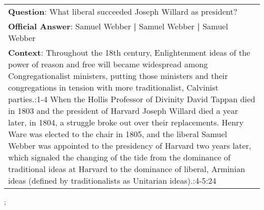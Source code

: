 \begin{figure*}[ht]
{\begin{tabular}{p{}}
            \textbf{Question}: What liberal succeeded Joseph Willard as president?                                                                                                                                                                                                                                                                                                                                                                                                                                                                                                                                                                                                                                                                                                                               \\
            \textbf{Official Answer}: Samuel Webber \textbf{|} Samuel Webber \textbf{|} Samuel Webber                                                                                                                                                                                                                                                                                                                                                                                                                                                                                                                                                                                                                                                                                                            \\
            \textbf{Context}: Throughout the 18th century, Enlightenment ideas of the power of reason and free will became widespread among Congregationalist ministers, putting those ministers and their congregations in tension with more traditionalist, Calvinist parties.:1-4 When the Hollis Professor of Divinity David Tappan died in 1803 and the president of Harvard Joseph Willard died a year later, in 1804, a struggle broke out over their replacements. Henry Ware was elected to the chair in 1805, and the liberal Samuel Webber was appointed to the presidency of Harvard two years later, which signaled the changing of the tide from the dominance of traditional ideas at Harvard to the dominance of liberal, Arminian ideas (defined by traditionalists as Unitarian ideas).:4-5:24 \\
        \end{tabular}
    };
    \label{fig:ex-5727b8df3acd2414000dea9a}
\end{figure*}

